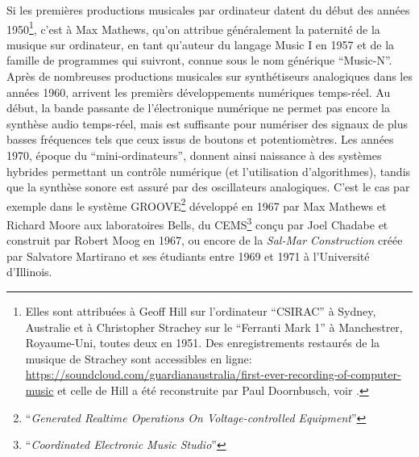 \noindent Si les premières productions musicales par ordinateur datent du début des années 1950\footnote{Elles sont attribuées à Geoff Hill sur l'ordinateur ``CSIRAC'' à Sydney, Australie et à Christopher Strachey sur le ``Ferranti Mark 1'' à Manchestrer, Royaume-Uni, toutes deux en 1951. Des enregistrements restaurés de la musique de Strachey sont accessibles en ligne: \\ \url{https://soundcloud.com/guardianaustralia/first-ever-recording-of-computer-music} et celle de Hill a été reconstruite par Paul Doornbusch, voir \cite{doornbusch_computer_2004}.}, c'est à Max Mathews, qu'on attribue généralement la paternité de la musique sur ordinateur, en tant qu'auteur du langage Music I en 1957 et de la famille de programmes qui suivront, connue sous le nom générique ``Music-N''.\\
\indent Après de nombreuses productions musicales sur synthétiseurs analogiques dans les années 1960, arrivent les premièrs développements numériques temps-réel. Au début, la bande passante de l'électronique numérique ne permet pas encore la synthèse audio temps-réel, mais est suffisante pour numériser des signaux de plus basses fréquences tels que ceux issus de boutons et potentiomètres. Les années 1970, époque du ``mini-ordinateurs'', donnent ainsi naissance à des systèmes hybrides permettant un contrôle numérique (et l'utilisation d'algorithmes), tandis que la synthèse sonore est assuré par des oscillateurs analogiques. C'est le cas par exemple dans le système GROOVE\footnote{``\textit{Generated Realtime Operations On Voltage-controlled Equipment}''} développé en 1967 par Max Mathews et Richard Moore aux laboratoires Bells, du CEMS\footnote{``\textit{Coordinated Electronic Music Studio}''} conçu par Joel Chadabe et construit par Robert Moog en 1967, ou encore de la \textit{Sal-Mar Construction} créée par Salvatore Martirano et ses étudiants entre 1969 et 1971 à l'Université d'Illinois. 
